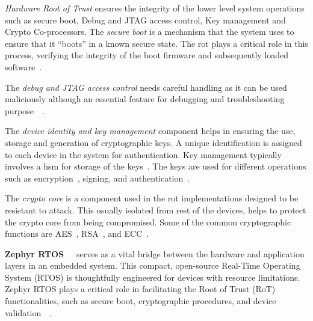 \textit{Hardware Root of Trust} ensures the integrity of the lower level system operations such as
secure boot\cite{zimmer2016establishing}, Debug and JTAG access control, Key management and Crypto Co-processors.
The \textit{secure boot} is a mechanism that the system uses to ensure that it ``boots'' in a known secure state.
The \acrshort{rot} plays a critical role in this process, verifying the integrity of the boot firmware and
subsequently loaded software~\cite{zimmer2016establishing}.

The \textit{debug and JTAG access control} needs careful handling as it can be used maliciously although
an essential feature for debugging and troubleshooting purpose~\cite{WhatisJT98:online}~\cite{JTAGhard62:online}.

The \textit{device identity and key management} component helps in ensuring the use, storage
and generation of cryptographic keys. A unique identification is assigned to each device
in the system for authentication. Key management typically involves a \gls{hsm} for storage
of the keys~\cite{WhatisKe81:online}. The keys are used for different operations such
as encryption~\cite{WhatisEn13:online}, signing, and authentication~\cite{needham1978using}.

The \textit{crypto core} is a component used in the \gls{rot} implementations
designed to be resistant to attack. This usually isolated from rest of the devices, helps
to protect the crypto core from being compromised. Some of the common cryptographic functions
are AES~\cite{nechvatal2001report}, RSA~\cite{milanov2009rsa}, and ECC~\cite{bos2014elliptic}.

\textbf{Zephyr RTOS\cite{Security75:online}~\cite{ZephyrPr4:online}~\cite{ZephyrPr92:online}}
serves as a vital bridge between the hardware and application layers in an embedded system.
This compact, open-source Real-Time Operating System (RTOS) is thoughtfully engineered for devices
with resource limitations. Zephyr RTOS plays a critical role in facilitating the Root of Trust (RoT)
functionalities, such as secure boot, cryptographic procedures,
and device validation\cite{Security75:online}~\cite{ZephyrPr4:online}~\cite{ZephyrPr92:online}.


